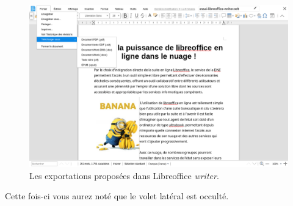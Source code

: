 \begin{figure}
    \centering
    \includegraphics[]{Captures/nuage.lool.writer.exportations.png}
    \caption{Les exportations proposées dans Libreoffice \emph{writer\/}.}
\end{figure}

Cette fois-ci vous aurez noté que le volet latéral est occulté.